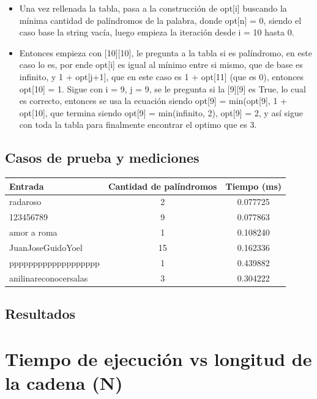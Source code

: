\documentclass[a4paper, 12pt]{article}
\begin{document}
\begin{itemize}
\item Una vez rellenada la tabla, pasa a la construcción de opt[i] buscando la mínima cantidad de palíndromos de la palabra, donde opt[n] = 0, siendo el caso base la string vacía, luego empieza la iteración desde i = 10 hasta 0.

\item Entonces empieza con [10][10], le pregunta a la tabla si es palíndromo, en este caso lo es, por ende opt[i] es igual al mínimo entre si mismo, que de base es infinito, y 1 + opt[j+1], que en este caso es 1 + opt[11] (que es 0), entonces opt[10] = 1. Sigue con i = 9, j = 9, se le pregunta si la [9][9] es True, lo cual es correcto, entonces se usa la ecuación siendo opt[9] = min(opt[9], 1 + opt[10], que termina siendo opt[9] = min(infinito, 2), opt[9] = 2, y así sigue con toda la tabla para finalmente encontrar el optimo que es 3.

\end{itemize}

\newpage
\subsection{Casos de prueba y mediciones}
\begin{tabular}{@{}lcc@{}}
\toprule
Entrada & Cantidad de palíndromos & Tiempo (ms) \\
\midrule
radaroso              & 2  & 0.077725 \\
123456789             & 9  & 0.077863 \\
amor a roma           & 1  & 0.108240 \\
JuanJoseGuidoYoel     & 15 & 0.162336 \\
ppppppppppppppppppp      & 1  & 0.439882 \\
anilinareconocersalas & 3  & 0.304222 \\
\bottomrule
\end{tabular}
\subsection{Resultados}
\section*{Tiempo de ejecución vs longitud de la cadena (N)}
\end{document}
